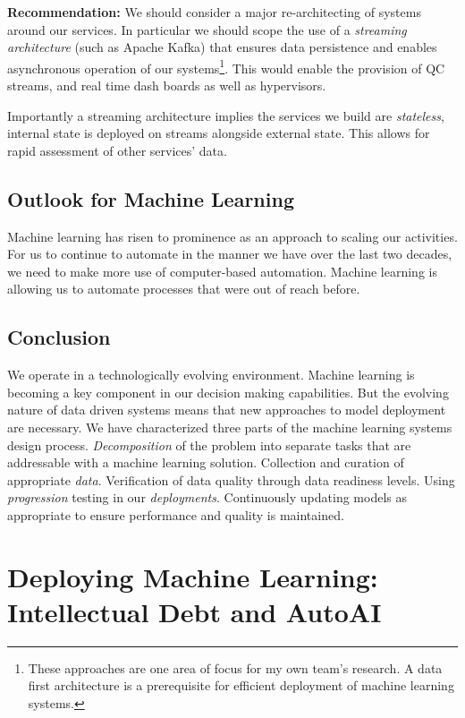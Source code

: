 \documentclass[a4paper]{caesar_book}
\let\oldchapter\chapter
\def\chapter{%
  \setcounter{footnote}{0}%
  \oldchapter
}
\begin{document}
\textbf{Recommendation:} We should consider a major re-architecting of systems around our services. In particular we should scope the use of a \textit{streaming architecture} (such as Apache Kafka) that ensures data persistence and enables asynchronous operation of our systems\footnote{These approaches are one area of focus for my own team's research. A data first architecture is a prerequisite for efficient deployment of machine learning systems.}. This would enable the provision of QC streams, and real time dash boards as well as hypervisors.

Importantly a streaming architecture implies the services we build are \textit{stateless}, internal state is deployed on streams alongside external state. This allows for rapid assessment of other services' data.

\section{Outlook for Machine Learning}

Machine learning has risen to prominence as an approach to scaling our activities. For us to continue to automate in the manner we have over the last two decades, we need to make more use of computer-based automation. Machine learning is allowing us to automate processes that were out of reach before.

\section{Conclusion}

We operate in a technologically evolving environment. Machine learning is becoming a key component in our decision making capabilities. But the evolving nature of data driven systems means that new approaches to model deployment are necessary. We have characterized three parts of the machine learning systems design process. \textit{Decomposition} of the problem into separate tasks that are addressable with a machine learning solution. Collection and curation of appropriate \textit{data}. Verification of data quality through data readiness levels. Using \textit{progression} testing in our \textit{deployments}. Continuously updating models as appropriate to ensure performance and quality is maintained.

\chapter{Deploying Machine Learning:\\Intellectual Debt and AutoAI}
\end{document}
